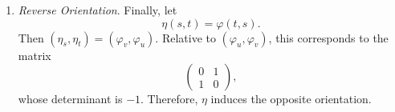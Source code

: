 \begin{example}
\begin{enumerate}
			\item \textit{Reverse Orientation}. Finally, let
				\begin{equation}
					\eta(s,t)=\varphi(t,s).
				\end{equation}
				Then $(\eta_s,\eta_t) = (\varphi_v,\varphi_u)$. Relative to $(\varphi_u,\varphi_v)$, this corresponds to the matrix
				\begin{equation}
					\begin{pmatrix}
					0 & 1 \\
					1 & 0
					\end{pmatrix},
				\end{equation}
				whose determinant is $-1$. Therefore, $\eta$ induces the opposite orientation.
		\end{enumerate}
	\end{example}


